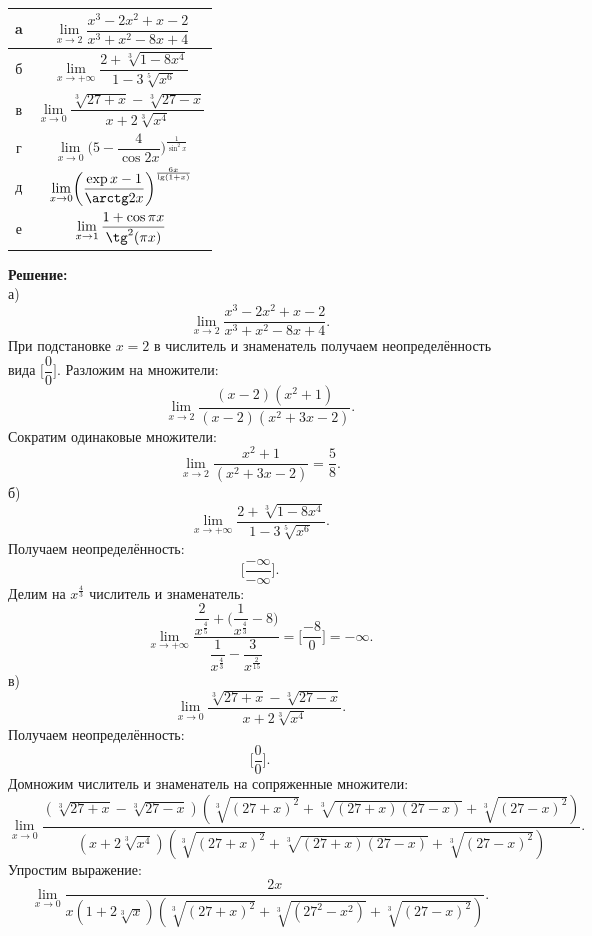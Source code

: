\documentclass[12pt]{article}
\begin{document}
\begin{table}[h]
    \centering
    \begin{tabular}{|c|c|}
        \hline
         a & $\lim\limits_{x\rightarrow 2} \dfrac{x^3-2x^2+x-2}{x^3+x^2-8x+4}$ \\
         \hline
         б & $\lim\limits_{x\rightarrow+\infty} \dfrac{2+\sqrt[3]{1-8x^4}}  {1-3\sqrt[5]{x^6}}$ \\
         \hline
         в & $\lim\limits_{x\rightarrow 0} \dfrac{\sqrt[3]{27+x}-\sqrt[3]{27-x}}{x+2\sqrt[3]{x^4}}$\\
         \hline
         г & $\lim\limits_{x\rightarrow 0} \biggl(5-\dfrac{4}{\cos{2x}}\biggl)^{\frac{1}{\sin^2{x}}}  $\\
         \hline
         д & $\lim\limits_{x\rightarrow 0} \biggl(\dfrac{\exp{x}-1}{\arctg2x}\bigg)^\frac{6x}{\lg({1+x})}$ \\
         \hline
         е & $\lim\limits_{x\rightarrow 1} \dfrac{1+\cos{\pi x}}{\tg^2(\pi x)}$\\
         \hline
    \end{tabular}
\end{table}
\textbf{Решение:}\\
а)
$$\lim\limits_{x\rightarrow 2} \dfrac{x^3-2x^2+x-2}{x^3+x^2-8x+4}.$$
При подстановке $ x=2$ в числитель и знаменатель получаем неопределённость вида $\biggl[\dfrac{0}{0}\biggr].$
Разложим на множители:
$$\lim\limits_{x\rightarrow 2} \dfrac{(x-2)(x^2+1)}{(x-2)(x^2+3x-2)} .$$
Сократим одинаковые множители:
$$\lim\limits_{x\rightarrow 2} \dfrac{x^2+1}{(x^2+3x-2)}=\dfrac{5}{8}.$$
б)
$$\lim\limits_{x\rightarrow+\infty}\dfrac{2+\sqrt[3]{1-8x^4}}  {1-3\sqrt[5]{x^6}} .$$
Получаем неопределённость: $$\biggl[\dfrac{-\infty}{-\infty}\biggr].$$
Делим на $x^{\frac{4}{3}}$ числитель и знаменатель:
$$\lim\limits_{x\rightarrow+\infty} \dfrac{\dfrac{2}{x^\frac{4}{5}}+\biggl(\dfrac{1}{x^\frac{4}{3}}-8\biggl)}{\dfrac{1}{x^\frac{4}{3}}-\dfrac{3}{x^\frac{2}{15}}} = \biggl[\dfrac{-8}{0}\biggl]=-\infty.$$
в)
$$\lim\limits_{x\rightarrow 0} \dfrac{\sqrt[3]{27+x}-\sqrt[3]{27-x}}{x+2\sqrt[3]{x^4}}.$$
Получаем неопределённость: $$\biggl[\dfrac{0}{0}\biggr].$$
Домножим числитель и знаменатель на сопряженные множители:
$$\lim\limits_{x\rightarrow 0} \dfrac{(\sqrt[3]{27+x}-\sqrt[3]{27-x})(\sqrt[3]{(27+x)^2}+\sqrt[3]{(27+x)(27-x)}+\sqrt[3]{(27-x)^2})}{(x+2\sqrt[3]{x^4})(\sqrt[3]{(27+x)^2}+\sqrt[3]{(27+x)(27-x)}+\sqrt[3]{(27-x)^2})}.$$
Упростим выражение:
$$\lim\limits_{x\rightarrow 0} \dfrac{2x}{x(1+2\sqrt[3]{x})(\sqrt[3]{(27+x)^2}+\sqrt[3]{(27^2-x^2)}+\sqrt[3]{(27-x)^2})}.$$
\end{document}
